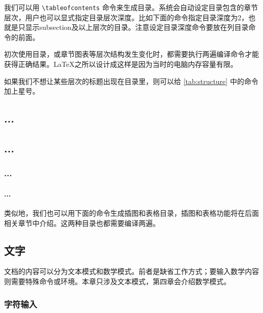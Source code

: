 我们可以用 \verb|\tableofcontents| 命令来生成目录。系统会自动设定目录包含的章节层次，用户也可以显式指定目录层次深度。比如下面的命令指定目录深度为2，也就是只显示subsection及以上层次的目录。注意设定目录深度命令要放在列目录命令的前面。

\begin{Code}[]
\setcounter{tocdepth}{2} %
\tableofcontents         %
\end{Code}

初次使用目录，或章节图表等层次结构发生变化时，都需要执行两遍编译命令才能获得正确结果。\LaTeX 之所以设计成这样是因为当时的电脑内存容量有限。

如果我们不想让某些层次的标题出现在目录里，则可以给 \autoref{tab:structure} 中的命令加上星号。

\begin{Code}[]
\chapter*{...}
\section*{...}
\subsection*{...}
\subsubsection*{...}
\end{Code}

类似地，我们也可以用下面的命令生成插图和表格目录，插图和表格功能将在后面相关章节中介绍。这两种目录也都需要编译两遍。

\begin{Code}[]
\listoffigures
\listoftables
\end{Code}

\section{文字}

文档的内容可以分为文本模式和数学模式。前者是缺省工作方式；要输入数学内容则需要特殊命令或环境。本章只涉及文本模式，第四章会介绍数学模式。

\subsection{字符输入}
\label{sec:char_input}

